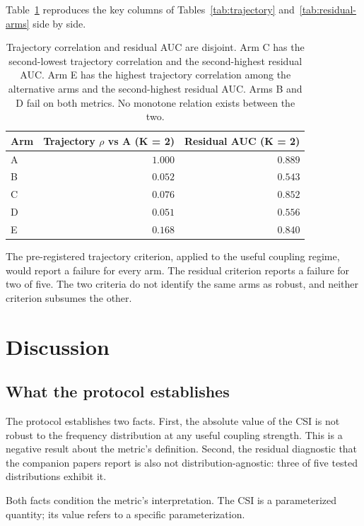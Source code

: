 \documentclass[11pt]{article}
\begin{document}
Table~\ref{tab:disjoint} reproduces the key columns of
Tables~\ref{tab:trajectory} and~\ref{tab:residual-arms} side by side.

\begin{table}[h]
\centering
\begin{tabular}{lrr}
\toprule
Arm & Trajectory $\rho$ vs A (K = 2) & Residual AUC (K = 2) \\
\midrule
A & $1.000$ & $0.889$ \\
B & $0.052$ & $0.543$ \\
C & $0.076$ & $0.852$ \\
D & $0.051$ & $0.556$ \\
E & $0.168$ & $0.840$ \\
\bottomrule
\end{tabular}
\caption{Trajectory correlation and residual AUC are disjoint. Arm C
has the second-lowest trajectory correlation and the second-highest
residual AUC. Arm E has the highest trajectory correlation among the
alternative arms and the second-highest residual AUC. Arms B and D
fail on both metrics. No monotone relation exists between the two.}
\label{tab:disjoint}
\end{table}

The pre-registered trajectory criterion, applied to the useful
coupling regime, would report a failure for every arm. The residual
criterion reports a failure for two of five. The two criteria do not
identify the same arms as robust, and neither criterion subsumes the
other.

\section{Discussion}

\subsection{What the protocol establishes}

The protocol establishes two facts. First, the absolute value of the
CSI is not robust to the frequency distribution at any useful coupling
strength. This is a negative result about the metric's definition.
Second, the residual diagnostic that the companion papers report is
also not distribution-agnostic: three of five tested distributions
exhibit it.

Both facts condition the metric's interpretation. The CSI is a
parameterized quantity; its value refers to a specific
parameterization.
\end{document}

